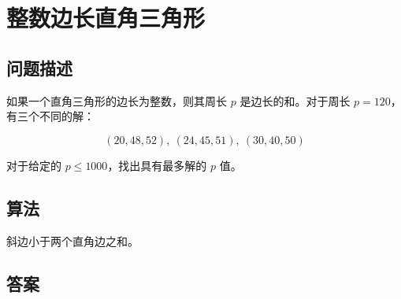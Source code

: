 \section{整数边长直角三角形}
\subsection{问题描述}
\begin{tcolorbox}

	如果一个直角三角形的边长为整数，则其周长 \( p \) 是边长的和。对于周长 \( p = 120 \)，有三个不同的解：

	\[
		(20, 48, 52),\ (24, 45, 51),\ (30, 40, 50)
	\]

	对于给定的 \( p \leq 1000 \)，找出具有最多解的 \( p \) 值。
\end{tcolorbox}

\subsection{算法}
斜边小于两个直角边之和。

\subsection{答案}
